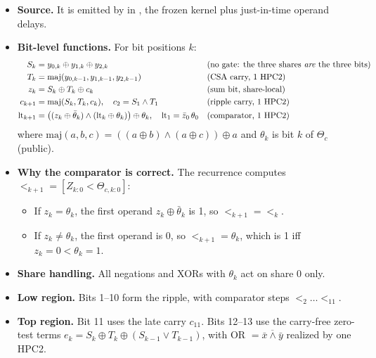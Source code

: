 \begin{itemize}
  \item \textbf{Source.} It is emitted by  in , the frozen kernel  plus just-in-time operand delays.
  \item \textbf{Bit-level functions.} For bit positions $k$:
  \begin{align*}
    S_k &= y_{0,k} \oplus y_{1,k} \oplus y_{2,k} && \text{(no gate: the three shares \emph{are} the three bits)}\\
    T_k &= \mathrm{maj}(y_{0,k-1}, y_{1,k-1}, y_{2,k-1}) && \text{(CSA carry, 1 HPC2)}\\
    z_k &= S_k \oplus T_k \oplus c_k && \text{(sum bit, share-local)}\\
    c_{k+1} &= \mathrm{maj}(S_k, T_k, c_k), \quad c_2 = S_1 \wedge T_1 && \text{(ripple carry, 1 HPC2)}\\
    \mathrm{lt}_{k+1} &= \bigl((z_k \oplus \bar\theta_k) \wedge (\mathrm{lt}_k \oplus \theta_k)\bigr) \oplus \theta_k, \quad \mathrm{lt}_1 = \bar z_0\, \theta_0 && \text{(comparator, 1 HPC2)}
  \end{align*}
  where $\mathrm{maj}(a, b, c) = ((a \oplus b) \wedge (a \oplus c)) \oplus a$ and $\theta_k$ is bit $k$ of $\Theta_c$ (public).
  \item \textbf{Why the comparator is correct.} The recurrence computes $\lt_{k+1} = [Z_{k:0} < \Theta_{c,k:0}]$:
  \begin{itemize}
    \item If $z_k = \theta_k$, the first operand $z_k \oplus \bar\theta_k$ is 1, so $\lt_{k+1} = \lt_k$.
    \item If $z_k \ne \theta_k$, the first operand is 0, so $\lt_{k+1} = \theta_k$, which is 1 iff $z_k = 0 < \theta_k = 1$.
  \end{itemize}
  \item \textbf{Share handling.} All negations and XORs with $\theta_k$ act on share 0 only.
  \item \textbf{Low region.} Bits 1--10 form the ripple, with comparator steps $\lt_2 \ldots \lt_{11}$.
  \item \textbf{Top region.} Bit 11 uses the late carry $c_{11}$. Bits 12--13 use the carry-free zero-test terms $e_k = S_k \oplus T_k \oplus (S_{k-1} \vee T_{k-1})$, with OR $= \overline{\bar x \wedge \bar y}$ realized by one HPC2.
\end{itemize}

